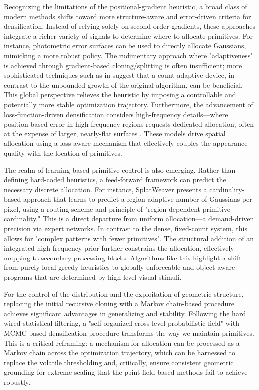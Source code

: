 \documentclass[11pt,a4paper]{article}
\begin{document}
Recognizing the limitations of the positional-gradient heuristic, a broad class of modern methods shifts toward more structure-aware and error-driven criteria for densification. Instead of relying solely on second-order gradients, these approaches integrate a richer variety of signals to determine where to allocate primitives. For instance, photometric error surfaces can be used to directly allocate Gaussians, mimicking a more robust policy. The rudimentary approach where "adaptiveness" is achieved through gradient-based cloning/splitting is often insufficient; more sophisticated techniques such as in \cite{arxiv:2502.19318v1} suggest that a count-adaptive device, in contrast to the unbounded growth of the original algorithm, can be beneficial. This global perspective relieves the heuristic by imposing a controllable and potentially more stable optimization trajectory. Furthermore, the advancement of loss-function-driven densification considers high-frequency details---where position-based error in high-frequency regions requests dedicated allocation, often at the expense of larger, nearly-flat surfaces \cite{arxiv:2506.13348v2,arxiv:2507.20200v1}. These models drive spatial allocation using a loss-aware mechanism that effectively couples the appearance quality with the location of primitives.

The realm of learning-based primitive control is also emerging. Rather than defining hard-coded heuristics, a feed-forward framework can predict the necessary discrete allocation. For instance, SplatWeaver \cite{arxiv:2605.07287v2} presents a cardinality-based approach that learns to predict a region-adaptive number of Gaussians per pixel, using a routing scheme and principle of "region-dependent primitive cardinality." This is a direct departure from uniform allocation---a demand-driven precision via expert networks. In contrast to the dense, fixed-count system, this allows for "complex patterns with fewer primitives". The structural addition of an integrated high-frequency prior further constrains the allocation, effectively mapping to secondary processing blocks. Algorithms like this highlight a shift from purely local greedy heuristics to globally enforceable and object-aware programs that are determined by high-level visual stimuli.

For the control of the distribution and the exploitation of geometric structure, replacing the initial recursive cloning with a Markov chain-based procedure achieves significant advantages in generalizing and stability. Following the hard wired statistical filtering, a "self-organized cross-level probabilistic field" with MCMC-based densification procedure \cite{arxiv:2601.17835v2} transforms the way we maintain primitives. This is a critical reframing: a mechanism for allocation can be processed as a Markov chain across the optimization trajectory, which can be harnessed to replace the volatile thresholding and, critically, ensure consistent geometric grounding for extreme scaling that the point-field-based methods fail to achieve robustly.
\end{document}
